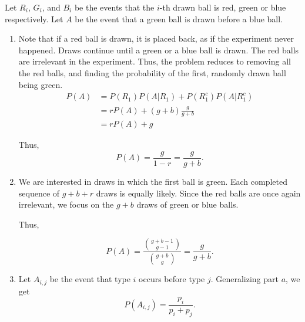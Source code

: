 Let $R_{i}$, $G_{i}$, and $B_{i}$ be the events that the $i$-th drawn ball is
red, green or blue respectively. Let $A$ be the event that a green ball is drawn
before a blue ball.

\begin{enumerate}[label=(\alph*)]
\item 

Note that if a red ball is drawn, it is placed back, as if the experiment never
happened. Draws continue until a green or a blue ball is drawn. The red
balls are irrelevant in the experiment. Thus, the problem reduces to removing
all the red balls, and finding the probability of the first, randomly drawn ball
being green.
\begin{align*}
P(A) &= P(R_{1})P(A|R_{1}) + P(R_{1}^{c})P(A|R_{1}^{c}) \\
&= rP(A) + (g + b)\frac{g}{g + b} \\
&= rP(A) + g
\end{align*}

Thus, $$P(A) = \frac{g}{1-r} = \frac{g}{g + b}.$$ 

\item We are interested in draws in which the first ball is green. Each
completed sequence of $g+b+r$ draws is equally likely. Since the red balls are
once again irrelevant, we focus on the $g+b$ draws of green or blue balls.

Thus,

$$P(A) = \frac{\binom{g+b-1}{g-1}}{\binom{g+b}{g}} = \frac{g}{g+b}.$$

\item Let $A_{i,j}$ be the event that type $i$ occurs before type
$j$. Generalizing part $a$, we get 
$$P(A_{i,j}) = \frac{p_{i}}{p_{i}+p_{j}}.$$
\end{enumerate}